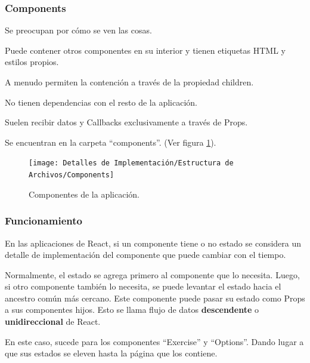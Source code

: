 \documentclass[12pt,twoside,titlepage]{report}
\begin{document}
\subsubsection{Components}

\begin{compactitem}
    \item Se preocupan por cómo se ven las cosas.
    \item Puede contener otros componentes en su interior y tienen etiquetas HTML y estilos propios.
    \item A menudo permiten la contención a través de la propiedad children.
    \item No tienen dependencias con el resto de la aplicación.
    \item Suelen recibir datos y Callbacks exclusivamente a través de Props.
    \item Se encuentran en la carpeta ``components''. (Ver figura \ref{fig:Components}).
\end{compactitem}

\begin{figure}[H]
    \centering
    \texttt{[image: Detalles de Implementación/Estructura de Archivos/Components]}
    \caption{Componentes de la aplicación.}
    \label{fig:Components}
\end{figure}

\subsubsection{Funcionamiento}

En las aplicaciones de React, si un componente tiene o no estado se considera un detalle de implementación del componente que puede cambiar con el tiempo.

Normalmente, el estado se agrega primero al componente que lo necesita. Luego, si otro componente también lo necesita, se puede levantar el estado hacia el ancestro común más cercano. Este componente puede pasar su estado como Props a sus componentes hijos. Esto se llama flujo de datos \textbf{descendente} o \textbf{unidireccional} de React. 

En este caso, sucede para los componentes ``Exercise'' y ``Options''. Dando lugar a que sus estados se eleven hasta la página que los contiene.
\end{document}
